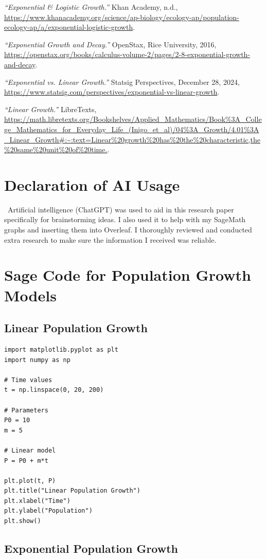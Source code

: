\documentclass{article}
\begin{document}
\textit{“Exponential \& Logistic Growth.”} Khan Academy, n.d.,
\url{https://www.khanacademy.org/science/ap-biology/ecology-ap/population-ecology-ap/a/exponential-logistic-growth}.

\textit{“Exponential Growth and Decay.”} OpenStax, Rice University, 2016, 
\url{https://openstax.org/books/calculus-volume-2/pages/2-8-exponential-growth-and-decay}.

\textit{“Exponential vs. Linear Growth.”} Statsig Perspectives, December 28, 2024,
\url{https://www.statsig.com/perspectives/exponential-vs-linear-growth}.

\textit{“Linear Growth.”} LibreTexts,
\url{https://math.libretexts.org/Bookshelves/Applied_Mathematics/Book%3A_College_Mathematics_for_Everyday_Life_(Inigo_et_al)/04%3A_Growth/4.01%3A_Linear_Growth#:~:text=Linear%20growth%20has%20the%20characteristic,the%20same%20unit%20of%20time.}.
\section{Declaration of AI Usage}\
Artificial intelligence (ChatGPT) was used to aid in this research paper specifically for brainstorming ideas. I also used it to help with my SageMath graphs and inserting them into Overleaf. I thoroughly reviewed and conducted extra research to make sure the information I received was reliable.
\newpage
\appendix
\section{Sage Code for Population Growth Models}

\subsection{Linear Population Growth}

\begin{lstlisting}[caption={Linear Growth Model}]
import matplotlib.pyplot as plt
import numpy as np

# Time values
t = np.linspace(0, 20, 200)

# Parameters
P0 = 10
m = 5

# Linear model
P = P0 + m*t

plt.plot(t, P)
plt.title("Linear Population Growth")
plt.xlabel("Time")
plt.ylabel("Population")
plt.show()
\end{lstlisting}


\subsection{Exponential Population Growth}
\end{document}
